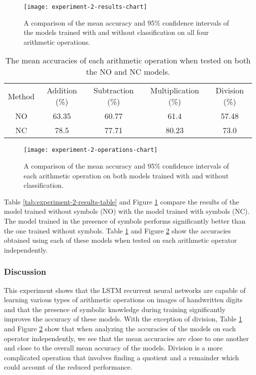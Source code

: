\begin{figure}[p]
	\centering
	\texttt{[image: experiment-2-results-chart]}
	\caption{A comparison of the mean accuracy and 95\% confidence intervals of the models trained with and without classification on all four arithmetic operations.}
	\label{fig:experiment-2-results-chart}
\end{figure}

\begin{table}
	\center
	\caption{The mean accuracies of each arithmetic operation when tested on both the NO and NC models.}
	\label{tab:experiment-2-operations-table}
	\begin{tabular}{ |c|c|c|c|c| } 
		\hline
		Method & Addition (\%) & Subtraction (\%)  & Multiplication (\%) & Division (\%)\\ 
		NO & 63.35 & 60.77 & 61.4 & 57.48\\  
		NC & 78.5 & 77.71 & 80.23 & 73.0\\  
		\hline
	\end{tabular}
\end{table}

\begin{figure}[t]
	\centering
	\texttt{[image: experiment-2-operations-chart]}
	\caption{A comparison of the mean accuracy and 95\% confidence intervals of each arithmetic operation on both models trained with and without classification.}
	\label{fig:experiment-2-operations-chart}
\end{figure}

Table \ref{tab:experiment-2-results-table} and Figure \ref{fig:experiment-2-results-chart} compare the results of the model trained without symbols (NO) with the model trained with symbols (NC). The model trained in the presence of symbols performs significantly better than the one trained without symbols. Table \ref{tab:experiment-2-operations-table} and Figure \ref{fig:experiment-2-operations-chart} show the accuracies obtained using each of these models when tested on each arithmetic operator independently.

\subsubsection{Discussion}

This experiment shows that the LSTM recurrent neural networks are capable of learning various types of arithmetic operations on images of handwritten digits and that the presence of symbolic knowledge during training significantly improves the accuracy of these models. With the exception of division, Table \ref{tab:experiment-2-operations-table} and Figure \ref{fig:experiment-2-operations-chart} show that when analyzing the accuracies of the models on each operator independently, we see that the mean accuracies are close to one another and close to the overall mean accuracy of the models. Division is a more complicated operation that involves finding a quotient and a remainder which could account of the reduced performance.